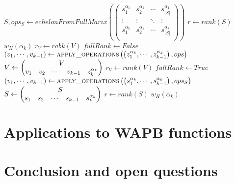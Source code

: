 \documentclass[11pt]{llncs}
\begin{document}
\begin{algorithm}
	\begin{algorithmic}
		\State $S, ops_S \gets echelonFromFullMarix\left(
		\begin{pmatrix}
		s_1^{\alpha_1} &  s_2^{\alpha_1} & \cdots & s_{|S|}^{\alpha_{1}}\\
		\vdots &  \vdots & \ddots & \vdots\\
		s_{1}^{\alpha_k} &  s_{2}^{\alpha_k} & \cdots & s_{|S|}^{\alpha_{k}}\\
		\end{pmatrix}\right)$
		\State $r \gets rank(S)$
		\State \Return $w_H\left(\alpha_k\right)$
		\EndIf
		\State $r_V \gets rabk(V)$
		\State $fullRank \gets False$
		\State $\left(v_1, \cdots, v_{k-1}\right) \gets \mbox{\textsc{apply\_operations}}\left(\left(z_1^{\alpha_k}, \cdots, z_{k-1}^{\alpha_k}\right), ops\right)$ 
		\State $V \gets \begin{pmatrix}
			\multicolumn{5}{c}{\multirow{1}{*}{$V$}} \\
			v_1 & v_2 & \cdots & v_{k-1} & z_{k}^{\alpha_k}
		\end{pmatrix}$
		\State $r_V \gets rank(V)$
		\State $fullRank \gets True$
		\EndIf
		\State $\left(v_1, \cdots, v_{k-1}\right) \gets \mbox{\textsc{apply\_operations}}\left(\left(s_1^{\alpha_k}, \cdots, s_{k-1}^{\alpha_k}\right), ops_S\right)$ 
		\State $S \gets \begin{pmatrix}
		\multicolumn{5}{c}{\multirow{1}{*}{$S$}} \\
		s_1 & s_2 & \cdots & s_{k-1} & s_{k}^{\alpha_k}
		\end{pmatrix}$
		\State $r \gets rank(S)$
		\State \Return $w_H\left(\alpha_k\right)$
		\EndIf
		\EndWhile
	\end{algorithmic}
\end{algorithm}

\section{Applications to WAPB functions}

\section{Conclusion and open questions}




\newpage



\ifnum{}


\else


\fi

\end{document}
